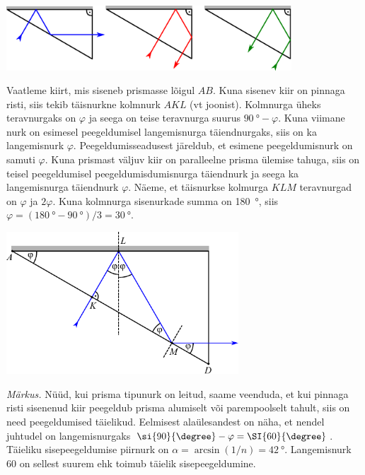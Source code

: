 {\begin{center}
  \includegraphics[width=0.8\textwidth]{2014-v3g-04-periskoopprillid_lahendus_joonis1.pdf}
\end{center}

\osa Vaatleme kiirt, mis siseneb prismasse lõigul $AB$. Kuna sisenev kiir on pinnaga risti, siis tekib täisnurkne kolmnurk $AKL$ (vt joonist). Kolmnurga üheks teravnurgaks on $\varphi$ ja seega on teise teravnurga suurus $\SI{90}{\degree}-\varphi$. Kuna viimane nurk on esimesel peegeldumisel langemisnurga täiendnurgaks, siis on ka langemisnurk $\varphi$. Peegeldumisseadusest järeldub, et esimene peegeldumisnurk on samuti $\varphi$. Kuna prismast väljuv kiir on paralleelne prisma ülemise tahuga, siis on teisel peegeldumisel peegeldumisdumisnurga täiendnurk ja seega ka langemisnurga täiendnurk $\varphi$. Näeme, et täisnurkse kolmurga $KLM$ teravnurgad on $\varphi$ ja $2\varphi$. Kuna kolmnurga sisenurkade summa on \SI{180}{\degree}, siis $\varphi=(\SI{180}{\degree}-\SI{90}{\degree})/3=\SI{30}{\degree}$.

\begin{center}
  \includegraphics[width=0.65\textwidth]{2014-v3g-04-periskoopprillid_lahendus_joonis2.pdf}
\end{center}

\emph{Märkus.} Nüüd, kui prisma tipunurk on leitud, saame veenduda, et kui pinnaga risti sisenenud kiir peegeldub prisma alumiselt või parempoolselt tahult, siis on need peegeldumised täielikud. Eelmisest alaülesandest on näha, et nendel juhtudel on langemisnurgaks $\si{90}{\degree}-\varphi=\SI{60}{\degree}$. Täieliku sisepeegeldumise piirnurk on $\alpha=\arcsin(1/n)=\SI{42}{\degree}$. Langemisnurk \si{60}{\degree} on sellest suurem ehk toimub täielik sisepeegeldumine.

}
